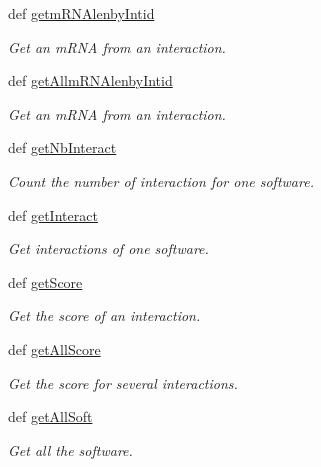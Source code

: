 \begin{DoxyCompactItemize}
def \hyperlink{classirna_1_1David2tulip_1_1Sqlite__manager_1_1Sqlite__manager_af6f6d348811f7980ea84242958f4c669}{getm\-R\-N\-Alenby\-Intid}
\begin{DoxyCompactList}\small\item\em \-Get an m\-R\-N\-A from an interaction. \end{DoxyCompactList}\item 
def \hyperlink{classirna_1_1David2tulip_1_1Sqlite__manager_1_1Sqlite__manager_aaea4c1b68069fdccf3378485b7677da3}{get\-Allm\-R\-N\-Alenby\-Intid}
\begin{DoxyCompactList}\small\item\em \-Get an m\-R\-N\-A from an interaction. \end{DoxyCompactList}\item 
def \hyperlink{classirna_1_1David2tulip_1_1Sqlite__manager_1_1Sqlite__manager_a9de9bd49abf8cf060048dec2034e836e}{get\-Nb\-Interact}
\begin{DoxyCompactList}\small\item\em \-Count the number of interaction for one software. \end{DoxyCompactList}\item 
def \hyperlink{classirna_1_1David2tulip_1_1Sqlite__manager_1_1Sqlite__manager_a25f14d7578cac9782e3351a2aacf55a5}{get\-Interact}
\begin{DoxyCompactList}\small\item\em \-Get interactions of one software. \end{DoxyCompactList}\item 
def \hyperlink{classirna_1_1David2tulip_1_1Sqlite__manager_1_1Sqlite__manager_a14542666030c7a76941476fd675666f4}{get\-Score}
\begin{DoxyCompactList}\small\item\em \-Get the score of an interaction. \end{DoxyCompactList}\item 
def \hyperlink{classirna_1_1David2tulip_1_1Sqlite__manager_1_1Sqlite__manager_a7a4489d90792990a7a69b2a54d445ea2}{get\-All\-Score}
\begin{DoxyCompactList}\small\item\em \-Get the score for several interactions. \end{DoxyCompactList}\item 
def \hyperlink{classirna_1_1David2tulip_1_1Sqlite__manager_1_1Sqlite__manager_a10b6daee76fed5133e0f23935b0bbd01}{get\-All\-Soft}
\begin{DoxyCompactList}\small\item\em \-Get all the software. \end{DoxyCompactList}\item 

\end{DoxyCompactItemize}
